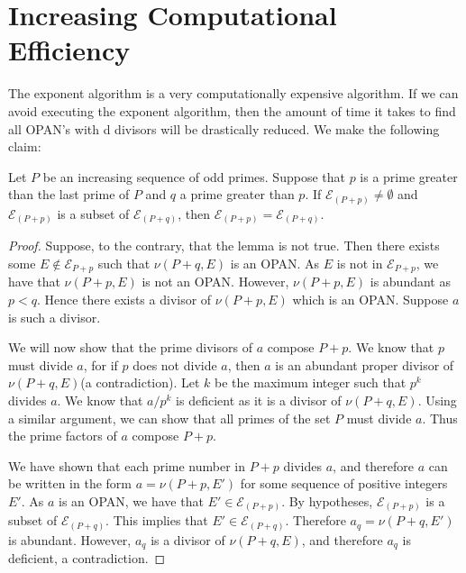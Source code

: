\documentclass[../paper.tex]{subfiles}
\begin{document}
\section{Increasing Computational Efficiency}

The exponent algorithm is a very computationally expensive
algorithm. If we can avoid executing the exponent algorithm, then
the amount of time it takes to find all OPAN's with d divisors will
be drastically reduced. 
We make the following claim:

\begin{lem}\label{first}
Let $P$ be an increasing sequence of odd primes. Suppose
that $p$ is a prime greater than the last prime of $P$ and $q$ a
prime greater than $p$. If $\mathcal{E}_{(P + p)} \neq 
\emptyset$ and $\mathcal{E}_{(P + p)}$ is a subset of 
$\mathcal{E}_{(P + q)}$, then $\mathcal{E}_{(P + p)} = 
\mathcal{E}_{(P + q)}$.
\end{lem}

\begin{proof}
  Suppose, to the contrary, that the lemma is not true. Then
there exists some $E \notin \mathcal{E}_{P + p}$ such that $\nu
(P + q, E)$ is an OPAN. As $E$ is not in $\mathcal{E}_{P + p}$,
we have that $\nu (P + p, E)$ is not an OPAN. However, $\nu (P +
p, E)$ is abundant as $p < q$. Hence there exists a divisor of  
$\nu (P + p, E)$ which is an OPAN. Suppose $a$ is such a divisor.  

  We will now show that the prime divisors of $a$ compose $P + p$.
We know that $p$ must divide $a$, for if $p$ does not divide $a$,
  then $a$ is an abundant proper divisor of $\nu (P + q, E)$(a contradiction). 
Let $k$ be the maximum
integer such that $p^k$ divides $a$. We know that $a / p^k$ is
deficient as it is a divisor of $\nu (P + q, E)$. Using a similar argument,
we can show that all primes of the set $P$ must divide $a$. 
Thus the prime factors of $a$ compose $P + p$. 

  We have shown that each prime number in $P + p$ divides $a$, and
therefore $a$ can be written in the form $a = \nu(P + p, E')$ for
some sequence of positive integers $E'$. As $a$ is an OPAN, we
have that $E' \in \mathcal{E}_{(P +p)}$. By hypotheses,
$\mathcal{E}_{(P + p)}$ is a subset of $\mathcal{E}_{(P + q)}$.
This implies that $E' \in \mathcal{E}_{(P + q)}$. Therefore $a_q = 
\nu(P + q, E')$ is abundant. However, $a_q$ is a divisor of
$\nu (P + q, E)$, and therefore $a_q$ is deficient, a
contradiction.

\end{proof}
\end{document}
